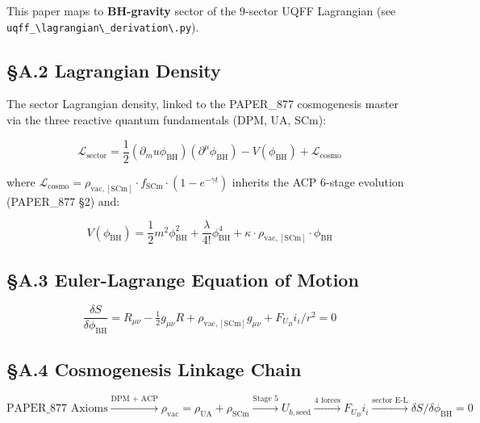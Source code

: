 \documentclass[12pt,a4paper]{article}
\begin{document}
This paper maps to \textbf{BH-gravity} sector of the 9-sector UQFF Lagrangian (see \texttt{uqff\_\textbackslash {lagrangian\textbackslash \_derivation\textbackslash }.py}).

\subsection{\S{}A.2 Lagrangian Density}

The sector Lagrangian density, linked to the PAPER\_877 cosmogenesis master via the three reactive quantum fundamentals (DPM, UA, SCm):

\begin{equation}
\mathcal{L}_{\mathrm{sector}} = \frac{1}{2}(\partial_mu \phi_{\mathrm{BH}})(\partial^\mu \phi_{\mathrm{BH}}) - V(\phi_{\mathrm{BH}}) + \mathcal{L}_{\mathrm{cosmo}}
\end{equation}

where $\mathcal{L}_{\mathrm{cosmo}} = \rho_{\mathrm{vac,[SCm]}} \cdot f_{\mathrm{SCm}} \cdot (1 - e^{-\gamma t})$ inherits the ACP 6-stage evolution (PAPER\_877 \S{}2) and:

\begin{equation}
V(\phi_{\mathrm{BH}}) = \frac{1}{2} m^2 \phi_{\mathrm{BH}}^2 + \frac{\lambda}{4!} \phi_{\mathrm{BH}}^4 + \kappa \cdot \rho_{\mathrm{vac,[SCm]}} \cdot \phi_{\mathrm{BH}}
\end{equation}

\subsection{\S{}A.3 Euler-Lagrange Equation of Motion}

\begin{equation}
\boxed{\frac{\delta S}{\delta \phi_{\mathrm{BH}}} = R_{\mu\nu} - \tfrac{1}{2}g_{\mu\nu}R + \rho_{\mathrm{vac,[SCm]}} g_{\mu\nu} + F_U_Bi_i/r^2 = 0}
\end{equation}

\subsection{\S{}A.4 Cosmogenesis Linkage Chain}

\begin{equation}
\text{PAPER\_877 Axioms} \xrightarrow{\text{DPM + ACP}} \rho_{\mathrm{vac}} = \rho_{\mathrm{UA}} + \rho_{\mathrm{SCm}} \xrightarrow{\text{Stage 5}} U_{b,\mathrm{seed}} \xrightarrow{\text{4 forces}} F_U_Bi_i \xrightarrow{\text{sector E-L}} \delta S/\delta \phi_{\mathrm{BH}} = 0
\end{equation}
\end{document}
